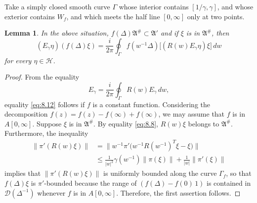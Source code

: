 \documentclass[12pt,b5paper,twoside]{article}
\theoremstyle{takesaki}
\newtheorem{lemma}{Lemma}[section]
\numberwithin{equation}{section}
\begin{document}
Take a simply closed smooth curve $\Gamma$ whose interior contains
$[1/\gamma,\gamma]$, and whose exterior contains $W_f$, and which
meets the half line $[0,\infty]$ only at two points.

\begin{lemma}\label{lem:8.5}
In the above situation, $f(\Delta)\mathfrak A^{\#}\subset\mathfrak A'$
and if $\xi$ is in $\mathfrak A^{\#}$, then
\begin{equation}
  (E_\gamma\eta)(f(\Delta)\xi)
  =\frac{i}{2\pi}\oint_\Gamma
  f(w^{-1}\Delta)\bigl[(R(w)E_\gamma\eta)\xi\bigr] \,dw
  \tag{8.12}\label{eq:8.12}
\end{equation}
for every $\eta\in\mathcal H$.
\end{lemma}

\begin{proof}
From the equality
\[
  E_\gamma=\frac{i}{2\pi}\oint_\Gamma R(w)E_\gamma\,dw,
\]
equality \eqref{eq:8.12} follows if $f$ is a constant function.
Considering the decomposition
$f(z)=f(z)-f(\infty)+f(\infty)$, we may assume that $f$ is in
$A[0,\infty]$.  Suppose $\xi$ is in $\mathfrak A^{\#}$.  By equality
\eqref{eq:8.8}, $R(w)\xi$ belongs to $\mathfrak A^{\#}$.
Furthermore, the inequality
\begin{align*}
 \|\pi'(R(w)\xi)\|
 &=\bigl\|w^{-1}\pi'\bigl(w^{-1}R(w^{-1})^T\xi-\xi\bigr)\bigr\|\\
 &\leq \frac{1}{|w|^2}\gamma(w^{-1})\|\pi(\xi)\|
      +\frac{1}{|w|}\|\pi'(\xi)\|
\end{align*}
implies that $\|\pi'(R(w)\xi)\|$ is uniformly bounded along the
curve $\Gamma_f$, so that $f(\Delta)\xi$ is $\pi'$-bounded because the
range of $(f(\Delta)-f(0)\,1)$ is contained in
$\mathcal D(\Delta^{-1})$ whenever $f$ is in $A[0,\infty]$.
Therefore, the first assertion follows.


\end{proof}
\end{document}
